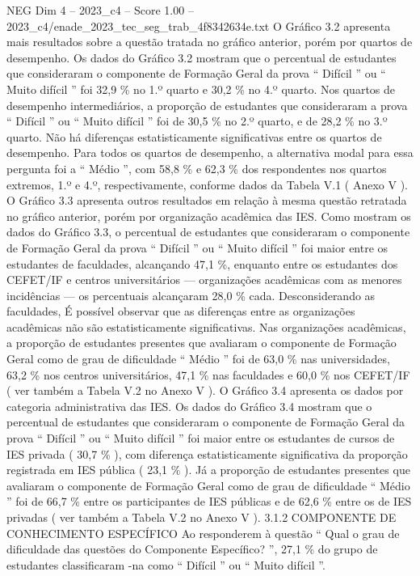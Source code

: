 \begin{textsample}{NEG Dim 4 – 2023\_c4 – Score 1.00 – 2023\_c4/enade\_2023\_tec\_seg\_trab\_4f8342634e.txt}
O Gráfico 3.2 apresenta mais resultados sobre a questão tratada no gráfico anterior, porém por quartos de desempenho.
Os dados do Gráfico 3.2 mostram que o percentual de estudantes que consideraram o componente de Formação Geral da prova “ Difícil ” ou “ Muito difícil ” foi 32,9 \% no 1.º quarto e 30,2 \% no 4.º quarto.
Nos quartos de desempenho intermediários, a proporção de estudantes que consideraram a prova “ Difícil ” ou “ Muito difícil ” foi de 30,5 \% no 2.º quarto, e de 28,2 \% no 3.º quarto.
Não há diferenças estatisticamente significativas entre os quartos de desempenho.
Para todos os quartos de desempenho, a alternativa modal para essa pergunta foi a “ Médio ”, com 58,8 \% e 62,3 \% dos respondentes nos quartos extremos, 1.º e 4.º, respectivamente, conforme dados da Tabela V.1 ( Anexo V ).
O Gráfico 3.3 apresenta outros resultados em relação à mesma questão retratada no gráfico anterior, porém por organização acadêmica das IES.
Como mostram os dados do Gráfico 3.3, o percentual de estudantes que consideraram o componente de Formação Geral da prova “ Difícil ” ou “ Muito difícil ” foi maior entre os estudantes de faculdades, alcançando 47,1 \%, enquanto entre os estudantes dos CEFET/IF e centros universitários — organizações acadêmicas com as menores incidências — os percentuais alcançaram 28,0 \% cada.
Desconsiderando as faculdades, É possível observar que as diferenças entre as organizações acadêmicas não são estatisticamente significativas.
Nas organizações acadêmicas, a proporção de estudantes presentes que avaliaram o componente de Formação Geral como de grau de dificuldade “ Médio ” foi de 63,0 \% nas universidades, 63,2 \% nos centros universitários, 47,1 \% nas faculdades e 60,0 \% nos CEFET/IF ( ver também a Tabela V.2 no Anexo V ).
O Gráfico 3.4 apresenta os dados por categoria administrativa das IES.
Os dados do Gráfico 3.4 mostram que o percentual de estudantes que consideraram o componente de Formação Geral da prova “ Difícil ” ou “ Muito difícil ” foi maior entre os estudantes de cursos de IES privada ( 30,7 \% ), com diferença estatisticamente significativa da proporção registrada em IES pública ( 23,1 \% ).
Já a proporção de estudantes presentes que avaliaram o componente de Formação Geral como de grau de dificuldade “ Médio ” foi de 66,7 \% entre os participantes de IES públicas e de 62,6 \% entre os de IES privadas ( ver também a Tabela V.2 no Anexo V ). 3.1.2 COMPONENTE DE CONHECIMENTO ESPECÍFICO Ao responderem à questão “ Qual o grau de dificuldade das questões do Componente Específico? ”, 27,1 \% do grupo de estudantes classificaram -na como “ Difícil ” ou “ Muito difícil ”.

\end{textsample}
